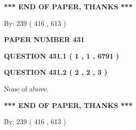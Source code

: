 \documentclass[12pt]{article}
\begin{document}
   
   
   
   
\vspace{1.0in} 
{\textbf{\large{ *** END OF PAPER, THANKS *** }}} 
   
   
\hspace{1.0in} By: 
 239 ( 416 ,  613 )
   
   
   
   
\newpage 
\setcounter{page}{ 
   431001 } 
   
   
   
   
 {\textbf{ \Large{ PAPER NUMBER  431  }}}
   
   
\vspace{0.2in}
   
   
   
   
   
   
 \vspace{0.2in}
 
 
 
 
   
   
  
\vspace{0.2in}
  
{\textbf{\Large{QUESTION
431.1 
 ( 1 , 1 , 6791 )
}}}
  
  
  
\vspace{0.2in}
  
{\textbf{\Large{QUESTION
431.2 
 ( 2 , 2 , 3 )
}}}
  
  
 
 
\noindent{}
 
 
 None of above.
 
 
 
 
   
   
 \vspace{0.2in}
 
   
   
   
   
\vspace{1.0in} 
{\textbf{\large{ *** END OF PAPER, THANKS *** }}} 
   
   
\hspace{1.0in} By: 
 239 ( 416 ,  613 )
   
   
   
   
\newpage 
\setcounter{page}{ 
   432001 } 
   
\end{document}
